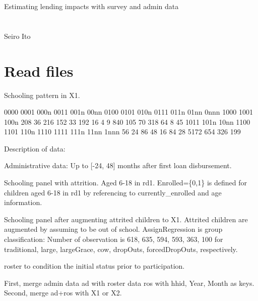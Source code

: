 \hfil Estimating lending impacts with survey and admin data\\

\hfil\MonthDY\\
\hfil{\footnotesize\currenttime}\\

\hfil Seiro Ito

\setcounter{tocdepth}{3}
\tableofcontents

\setlength{\parindent}{1em}
\vspace{2ex}


\section{Read files}



Schooling pattern in X1.
\begin{Schunk}
\begin{Soutput}

0000 0001 000n 0011 001n 00nn 0100 0101 010n 0111 011n 01nn 0nnn 1000 1001 100n 
 208   36  216  152   33  192   16    4    9  840  105   70  318   64    8   45 
1011 101n 10nn 1100 1101 110n 1110 1111 111n 11nn 1nnn 
  56   24   86   48   16   84   28 5172  654  326  199 
\end{Soutput}
\end{Schunk}
Description of data:
\begin{description}
\vspace{1.0ex}\setlength{\itemsep}{1.0ex}\setlength{\baselineskip}{12pt}
\item[ad]	Administrative data: Up to [-24, 48] months after first loan disbursement.
\item[X1]	Schooling panel with attrition. Aged 6-18 in rd1. \textsf{Enrolled=\{0,1\}} is defined for children aged 6-18 in rd1 by referencing to \textsf{currently\_enrolled} and age information.
\item[X2]	Schooling panel after augmenting attrited children to \textsf{X1}. Attrited children are augmented by assuming to be out of school. \textsf{AssignRegression} is group classification: Number of observation is \textsf{618, 635, 594, 593, 363, 100} for \textsf{traditional, large, largeGrace, cow, dropOuts, forcedDropOuts}, respectively.
\item[ros]	 \textsf{roster} to condition the initial status prior to participation.
\end{description}
First, merge admin data \textsf{ad} with roster data \textsf{ros} with \textsf{hhid, Year, Month} as keys. Second, merge \textsf{ad+ros} with \textsf{X1} or \textsf{X2}.
